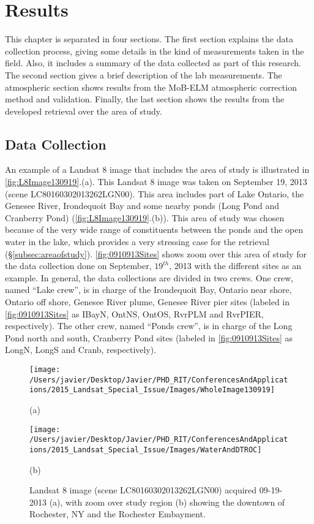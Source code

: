 \chapter{Results}
\label{ch:results}
This chapter is separated in four sections. The first section explains the data collection process, giving some details in the kind of measurements taken in the field. Also, it includes a summary of the data collected as part of this research. The second section gives a brief description of the lab measurements. The atmospheric section shows results from the MoB-ELM atmospheric correction method and validation. Finally, the last section shows the results from the developed retrieval over the area of study.
\section{Data Collection}
An example of a Landsat 8 image that includes the area of study is illustrated in \autoref{fig:L8Image130919}.(a). This Landsat 8 image was taken on September 19, 2013 (scene LC80160302013262LGN00). This area includes part of Lake Ontario, the Genesee River, Irondequoit Bay and some nearby ponds (Long Pond and Cranberry Pond) (\autoref{fig:L8Image130919}.(b)). This area of study was chosen because of the very wide range of constituents between the ponds and the open water in the lake, which provides a very stressing case for the retrieval (\S\ref{subsec:areaofstudy}). \autoref{fig:0910913Sites} shows zoom over this area of study for the data collection done on September, $19^{th}$, 2013  with the different sites as an example. In general, the data collections are divided in two crews. One crew, named ``Lake crew'', is in charge of the Irondequoit Bay, Ontario near shore, Ontario off shore, Genesee River plume, Genesee River pier sites (labeled in \autoref{fig:0910913Sites} as IBayN, OntNS, OntOS, RvrPLM and RvrPIER, respectively). The other crew, named ``Ponds crew'', is in charge of the Long Pond north and south, Cranberry Pond sites (labeled in \autoref{fig:0910913Sites} as LongN, LongS and Cranb, respectively).

\begin{figure}[htb!]
    \begin{minipage}[c]{0.48\linewidth}
      \centering
      \texttt{[image: /Users/javier/Desktop/Javier/PHD\_RIT/ConferencesAndApplications/2015\_Landsat\_Special\_Issue/Images/WholeImage130919]}
      \centerline{(a)}\medskip
    \end{minipage}
    \hfill
    \begin{minipage}[d]{0.48\linewidth}
      \centering
      \texttt{[image: /Users/javier/Desktop/Javier/PHD\_RIT/ConferencesAndApplications/2015\_Landsat\_Special\_Issue/Images/WaterAndDTROC]}
      \centerline{(b)}\medskip
    \end{minipage}  
    \caption{Landsat 8 image (scene LC80160302013262LGN00) acquired 09-19-2013 (a), with zoom over study region (b) showing the downtown of Rochester, NY and the Rochester Embayment. \label{fig:L8Image130919} }
\end{figure}

